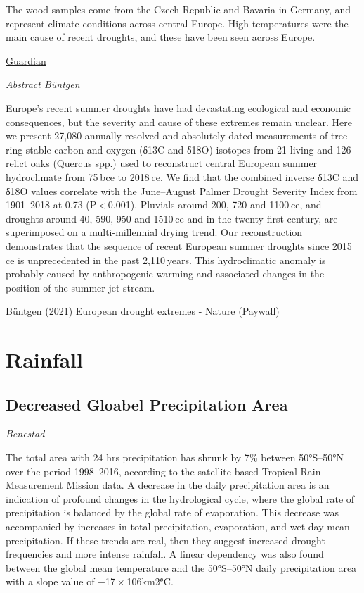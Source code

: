 \documentclass[
]{book}
\begin{document}
The wood samples come from the Czech Republic and Bavaria in Germany, and represent climate conditions across central Europe. High temperatures were the main cause of recent droughts, and these have been seen across Europe.

\href{https://www.theguardian.com/environment/2021/mar/15/climate-crisis-recent-european-droughts-worst-in-2000-years}{Guardian}

\emph{Abstract Büntgen}

Europe's recent summer droughts have had devastating ecological and economic consequences, but the severity and cause of these extremes remain unclear. Here we present 27,080 annually resolved and absolutely dated measurements of tree-ring stable carbon and oxygen (δ13C and δ18O) isotopes from 21 living and 126 relict oaks (Quercus spp.) used to reconstruct central European summer hydroclimate from 75 bce to 2018 ce. We find that the combined inverse δ13C and δ18O values correlate with the June--August Palmer Drought Severity Index from 1901--2018 at 0.73 (P \textless{} 0.001). Pluvials around 200, 720 and 1100 ce, and droughts around 40, 590, 950 and 1510 ce and in the twenty-first century, are superimposed on a multi-millennial drying trend. Our reconstruction demonstrates that the sequence of recent European summer droughts since 2015 ce is unprecedented in the past 2,110 years. This hydroclimatic anomaly is probably caused by anthropogenic warming and associated changes in the position of the summer jet stream.

\href{https://www.nature.com/articles/s41561-021-00698-0}{Büntgen (2021) European drought extremes - Nature (Paywall)}

\hypertarget{rainfall}{%
\section{Rainfall}\label{rainfall}}

\hypertarget{decreased-gloabel-precipitation-area}{%
\subsection{Decreased Gloabel Precipitation Area}\label{decreased-gloabel-precipitation-area}}

\emph{Benestad}

The total area with 24 hrs precipitation has shrunk by 7\% between 50°S--50°N over the period 1998--2016, according to the satellite-based Tropical Rain Measurement Mission data. A decrease in the daily precipitation area is an indication of profound changes in the hydrological cycle, where the global rate of precipitation is balanced by the global rate of evaporation. This decrease was accompanied by increases in total precipitation, evaporation, and wet-day mean precipitation. If these trends are real, then they suggest increased drought frequencies and more intense rainfall.
A linear dependency was also found between the global mean temperature and the 50°S--50°N daily precipitation area with a slope value of −17 × 106km2∕°C.
\end{document}
